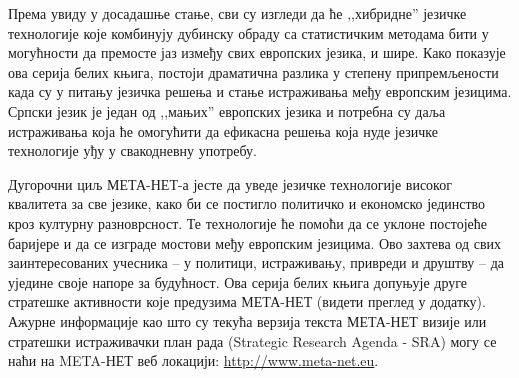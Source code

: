 \begin{multicols}{2}

Према увиду у досадашње стање, сви су изгледи да ће ,,хибридне'' језичке технологије које комбинују дубинску обраду са статистичким методама бити у могућности да премосте јаз између свих европских језика, и шире. Како показује ова серија белих књига, постоји драматична разлика у степену припремљености када су у питању језичка решења и стање истраживања међу европским језицима.  Српски језик је један од ,,мањих'' европских језика и потребна су даља истраживања која ће омогућити да ефикасна решења која нуде језичке технологије уђу у свакодневну употребу.

Дугорочни циљ МЕТА-НЕТ-а јесте да уведе језичке технологије високог квалитета за све језике, како би се постигло политичко и економско јединство кроз културну разноврсност. Те технологије ће помоћи да се уклоне постојеће баријере и да се изграде мостови међу европским језицима. Ово захтева од свих заинтересованих учесника – у политици, истраживању, привреди и друштву – да уједине своје напоре за будућност. Ова серија белих књига допуњује друге стратешке активности које предузима МЕТА-НЕТ (видети преглед у додатку). Ажурне информације као што су текућа верзија текста МЕТА-НЕТ визије  \cite{Meta1} или стратешки истраживачки план рада (Strategic Research Agenda - SRA) могу се наћи на META-НЕТ веб локацији: \url{http://www.meta-net.eu}.   
    
\end{multicols}

\clearpage


  
